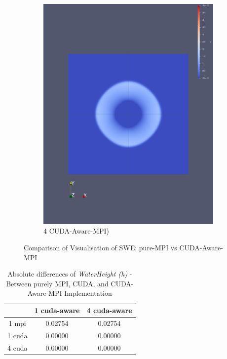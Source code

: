 \documentclass[article]{scrartcl}
\begin{document}
\begin{figure}[htpb]
%
    \begin{subfigure}{.3\textwidth}
    \centering
    \includegraphics[width=\textwidth,keepaspectratio=true]{../figs/1_validation_cuda_aware_4mpi.png}
    \caption{4 CUDA-Aware-MPI)}
    \label{fig:4mpi-cuda-aware}
    \end{subfigure}
    \caption{Comparison of Visualisation of SWE: pure-MPI vs CUDA-Aware-MPI}
    \label{figs:validation_cuda_aware}
\end{figure}

\begin{table}[h!]
  \centering
\begin{tabular}{ |c|c|c|}
  \hline
        & 1 cuda-aware& 4 cuda-aware \\
  \hline
  1 mpi & 0.02754     & 0.02754 \\
  \hline
  1 cuda& 0.00000     &  0.00000 \\
  \hline
  4 cuda& 0.00000     & 0.00000 \\
  \hline
\end{tabular}
\caption{Absolute differences of \textit{WaterHeight (h)} - Between purely MPI, CUDA, and CUDA-Aware MPI Implementation}
\label{table:cuda_aware}
\end{table}
\end{document}
